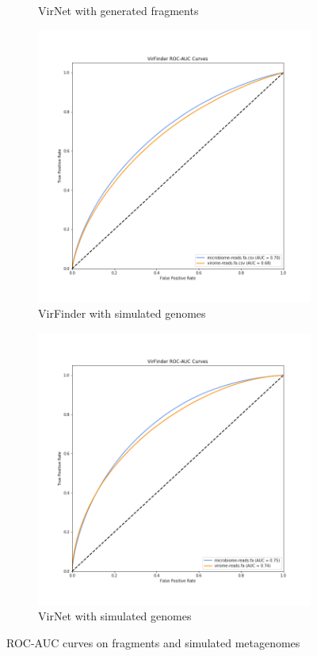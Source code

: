 \documentclass[10pt,journal,compsoc]{IEEEtran}
\begin{document}
\begin{figure}[!htbp]
\begin{subfigure}{0.3\textwidth}
		\caption{VirNet with generated fragments} 
		\label{fig:roc_auc_virneta}
	\end{subfigure}
	\begin{subfigure}{0.3\textwidth}
		\includegraphics[width=\linewidth]{imgs/roc_auc_simulated.png}
		\caption{VirFinder with simulated genomes} 
		\label{fig:roc_auc_virfinderb}
	\end{subfigure}
	\begin{subfigure}{0.3\textwidth}
		\includegraphics[width=\linewidth]{imgs/virnet_roc_auc_simulated.png}
		\caption{VirNet with simulated genomes} 
		\label{fig:roc_auc_virnetb}
	\end{subfigure}
	\caption{ROC-AUC curves on fragments and simulated metagenomes} 
	\label{fig:roc_auc_virfinder}
\end{figure}
\end{document}
